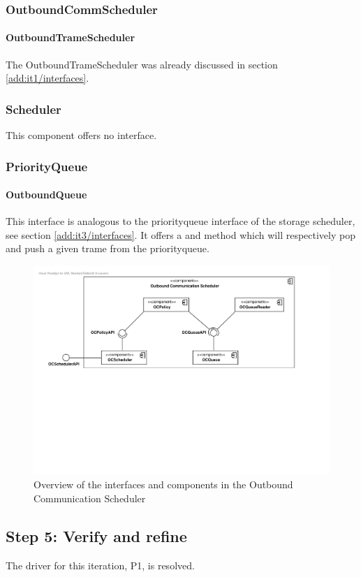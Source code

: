 \subsubsection{OutboundCommScheduler}

\paragraph{OutboundTrameScheduler}

\npar The OutboundTrameScheduler was already discussed in section
\ref{add:it1/interfaces}.

\subsubsection{Scheduler}

\npar This component offers no interface.

\subsubsection{PriorityQueue}

\paragraph{OutboundQueue}

\npar This interface is analogous to the priorityqueue interface of the storage
scheduler, see section \ref{add:it3/interfaces}. It offers a 
and  method which will respectively pop and push a given
trame from the priorityqueue.

\begin{figure}[H]
	\begin{centering}
		\includegraphics[width=\textwidth]{figs/add-it6-interfaces.pdf}
		\caption{Overview of the interfaces and components in the
		Outbound Communication Scheduler}
		\label{fig:it6/interfaces}
	\end{centering}
\end{figure}

\subsection{Step 5: Verify and refine}
\label{add:it6/verification}

\npar The driver for this iteration, P1, is resolved.